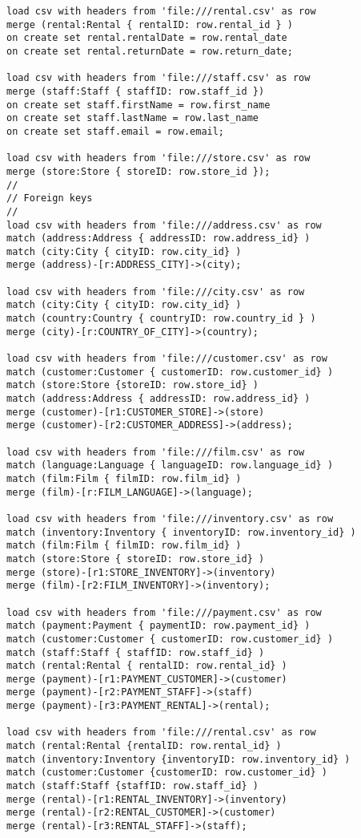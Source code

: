 \begin{verbatim}
load csv with headers from 'file:///rental.csv' as row
merge (rental:Rental { rentalID: row.rental_id } )
on create set rental.rentalDate = row.rental_date
on create set rental.returnDate = row.return_date;

load csv with headers from 'file:///staff.csv' as row
merge (staff:Staff { staffID: row.staff_id }) 
on create set staff.firstName = row.first_name
on create set staff.lastName = row.last_name
on create set staff.email = row.email;

load csv with headers from 'file:///store.csv' as row
merge (store:Store { storeID: row.store_id });
//
// Foreign keys
//
load csv with headers from 'file:///address.csv' as row
match (address:Address { addressID: row.address_id} )
match (city:City { cityID: row.city_id} )
merge (address)-[r:ADDRESS_CITY]->(city);

load csv with headers from 'file:///city.csv' as row
match (city:City { cityID: row.city_id} )
match (country:Country { countryID: row.country_id } )
merge (city)-[r:COUNTRY_OF_CITY]->(country);

load csv with headers from 'file:///customer.csv' as row
match (customer:Customer { customerID: row.customer_id} )
match (store:Store {storeID: row.store_id} )
match (address:Address { addressID: row.address_id} )
merge (customer)-[r1:CUSTOMER_STORE]->(store)
merge (customer)-[r2:CUSTOMER_ADDRESS]->(address);

load csv with headers from 'file:///film.csv' as row
match (language:Language { languageID: row.language_id} )
match (film:Film { filmID: row.film_id} )
merge (film)-[r:FILM_LANGUAGE]->(language);

load csv with headers from 'file:///inventory.csv' as row
match (inventory:Inventory { inventoryID: row.inventory_id} )
match (film:Film { filmID: row.film_id} )
match (store:Store { storeID: row.store_id} )
merge (store)-[r1:STORE_INVENTORY]->(inventory)
merge (film)-[r2:FILM_INVENTORY]->(inventory);

load csv with headers from 'file:///payment.csv' as row
match (payment:Payment { paymentID: row.payment_id} )
match (customer:Customer { customerID: row.customer_id} )
match (staff:Staff { staffID: row.staff_id} )
match (rental:Rental { rentalID: row.rental_id} )
merge (payment)-[r1:PAYMENT_CUSTOMER]->(customer)
merge (payment)-[r2:PAYMENT_STAFF]->(staff)
merge (payment)-[r3:PAYMENT_RENTAL]->(rental);

load csv with headers from 'file:///rental.csv' as row
match (rental:Rental {rentalID: row.rental_id} )
match (inventory:Inventory {inventoryID: row.inventory_id} )
match (customer:Customer {customerID: row.customer_id} )
match (staff:Staff {staffID: row.staff_id} )
merge (rental)-[r1:RENTAL_INVENTORY]->(inventory)
merge (rental)-[r2:RENTAL_CUSTOMER]->(customer)
merge (rental)-[r3:RENTAL_STAFF]->(staff);


\end{verbatim}
